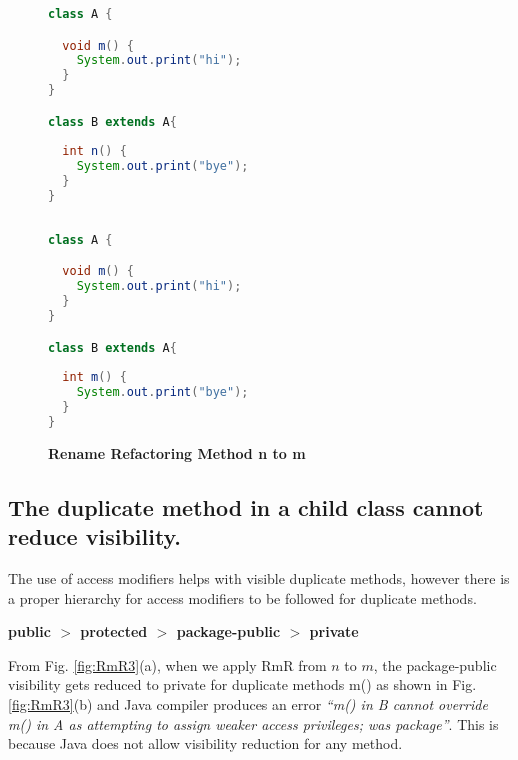 \begin{figure}[th]
\centering
\begin{minipage}[t]{0.47\linewidth}
\begin{lstlisting}[language=java, basicstyle=\scriptsize\ttfamily,frame=single]
class A {

  void m() {
    System.out.print("hi");
  }
}

class B extends A{
 
  int n() {
    System.out.print("bye");
  }	
}
 
\end{lstlisting}
\end{minipage}
\hfill
\begin{minipage}[t]{0.47\linewidth}
\begin{lstlisting}[language=java, basicstyle=\scriptsize\ttfamily,frame=single]
class A {

  void m() {
    System.out.print("hi");
  }
}

class B extends A{
 
  int m() {
    System.out.print("bye");
  }	
}

\end{lstlisting}
\end{minipage}
\caption{\textbf{Rename Refactoring Method n to m}}
\label{fig:RmR2}
\end{figure}

\subsection{The duplicate method in a child class cannot reduce visibility.}

The use of access modifiers helps with visible duplicate methods, however there is a proper hierarchy for access modifiers to be followed for duplicate methods.


\begin{center}
\textbf{public $>$ protected $>$ package-public $>$ private}
\end{center}


From Fig. \ref{fig:RmR3}(a), when we apply RmR from $n$ to $m$, the package-public visibility gets reduced to private for duplicate methods m() as shown in Fig. \ref{fig:RmR3}(b) and Java compiler produces an error \textsl{``m() in B cannot override m() in A as attempting to assign weaker access privileges; was package''}. This is because Java does not allow visibility reduction for any method. 

